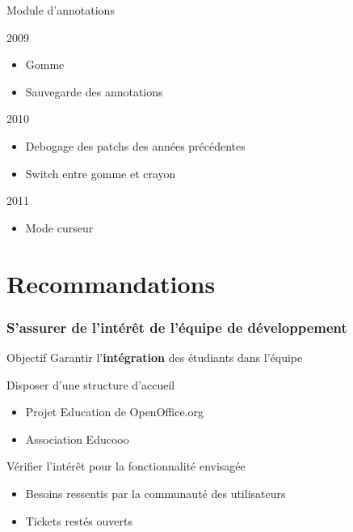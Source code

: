 \documentclass[hyperref,french,usenames,xcolor=dvipsnames]{beamer}
\begin{document}
\begin{frame}{Module d'annotations}
    \begin{block}{2009}
        \begin{itemize}
            \item Gomme
	    \item Sauvegarde des annotations
        \end{itemize}
    \end{block}
    \begin{block}{2010}
        \begin{itemize}
            \item Debogage des patchs des années précédentes
	        \item Switch entre gomme et crayon
        \end{itemize}
    \end{block}
    \begin{block}{2011}
        \begin{itemize}
            \item Mode curseur
        \end{itemize}
    \end{block}
\end{frame}

\section{Recommandations}

\frame
{
  \frametitle{S'assurer de l'intérêt de l'équipe de développement}

\begin{alertblock}{Objectif}
Garantir l'\textbf{intégration} des étudiants dans l'équipe 
\end{alertblock}

\begin{block}{Disposer d'une structure d'accueil}
\begin{itemize}
\item Projet Education de OpenOffice.org 
\item Association Educooo
\end{itemize}
\end{block}

\begin{block}{Vérifier l'intérêt pour la fonctionnalité envisagée}
\begin{itemize}
\item Besoins ressentis par la communauté des utilisateurs 
\item Tickets restés ouverts  
\end{itemize}
\end{block}

}
\end{document}
